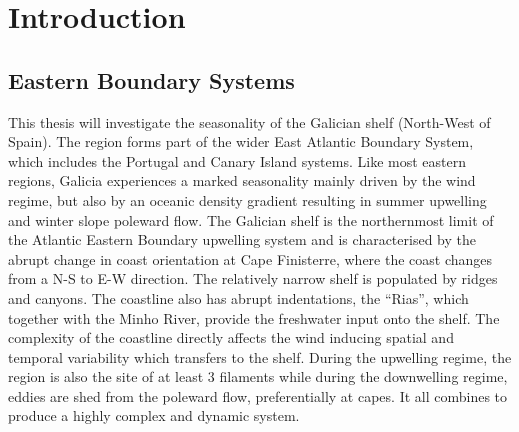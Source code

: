 \chapter{Introduction}
\section{Eastern Boundary Systems}
This thesis will investigate the seasonality of the Galician shelf
(North-West of Spain). The region forms part of the wider East
Atlantic Boundary System, which includes the Portugal and Canary
Island systems. Like most eastern regions, Galicia experiences a
marked seasonality mainly driven by the wind regime, but also by
an oceanic density gradient resulting in summer upwelling and
winter slope poleward flow. The Galician shelf is the northernmost
limit of the Atlantic Eastern Boundary upwelling system and is
characterised by the abrupt change in coast orientation at Cape
Finisterre, where the coast changes from a N-S to E-W direction.
The relatively narrow shelf is populated by ridges and canyons.
The coastline also has abrupt indentations, the ``Rias'', which
together with the Minho River, provide the freshwater input onto
the shelf. The complexity of the coastline directly affects the
wind inducing spatial and temporal variability which transfers to
the shelf. During the upwelling regime, the region is also the
site of at least 3 filaments while during the downwelling regime,
eddies are shed from the poleward flow, preferentially at capes.
It all combines to produce a highly complex and dynamic system.

